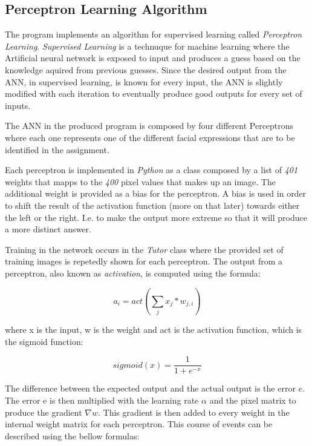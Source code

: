 \documentclass[12pt]{article}
\begin{document}
\subsection {Perceptron Learning Algorithm} 

The program implements an algorithm for supervised learning called
\textit{Perceptron Learning}. \textit{Supervised Learning} is a technuque for
machine learning where the Artificial neural network is exposed to input and
produces a guess based on the knowledge aquired from previous guesses. Since the
desired output from the ANN, in supervised learning, is known for every input,
the ANN is slightly modified with each iteration to eventually produce good
outputs for every set of inputs.

The ANN in the produced program is composed by four different Perceptrons
where each one represents one of the different facial expressions that are
to be identified in the assignment.

Each perceptron is implemented in \textit{Python} as a class composed by a
list of \textit{401} weights that mapps to the \textit{400} pixel values
that makes up an image. The additional weight is provided as a bias for
the perceptron. A bias is used in order to shift the result of the activation
function (more on that later) towards either the left or the right. I.e.
to make the output more extreme so that it will produce a more distinct
answer.

Training in the network occurs in the \textit{Tutor} class where the provided
set of training images is repetedly shown for each perceptron. The output
from a perceptron, also known as \textit{activation}, is computed using
the formula:

\begin{equation*}
  a_i = act(\sum_j x_j*w_{j,i})
\end{equation*}

where x is the input, w is the weight and act is the activation function,
which is the sigmoid function:

\begin{equation*}
	sigmoid(x) = \frac{1}{1+e^{-x}}
\end{equation*}


The difference between the expected output and the actual output is the
error $e$. The error e is then multiplied with the learning rate $\alpha$
and the pixel matrix to produce the gradient $\nabla w$. This
gradient is then added to every weight in the internal weight matrix for each
perceptron. This course of events can be described using the bellow formulas:
\end{document}
